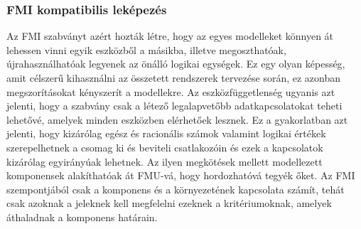         \subsubsection{FMI kompatibilis leképezés}
        Az FMI szabványt azért hozták létre, hogy az egyes modelleket könnyen át lehessen vinni egyik eszközből a másikba, illetve megoszthatóak, újrahasználhatóak legyenek az önálló logikai egységek.
        Ez egy olyan képesség, amit célszerű kihasználni az összetett rendszerek tervezése során, ez azonban megszorításokat kényszerít a modellekre.
        Az eszközfüggetlenség ugyanis azt jelenti, hogy a szabvány csak a létező legalapvetőbb adatkapcsolatokat teheti lehetővé, amelyek minden eszközben elérhetőek lesznek.
        Ez a gyakorlatban azt jelenti, hogy kizárólag egész és racionális számok valamint logikai értékek szerepelhetnek a csomag ki és beviteli csatlakozóin és ezek a kapcsolatok kizárólag egyirányúak lehetnek.
        Az ilyen megkötések mellett modellezett komponensek alakíthatóak át FMU-vá, hogy hordozhatóvá tegyék őket.
        Az FMI szempontjából csak a komponens és a környezetének kapcsolata számít, tehát csak azoknak a jeleknek kell megfelelni ezeknek a kritériumoknak, amelyek áthaladnak a komponens határain.

